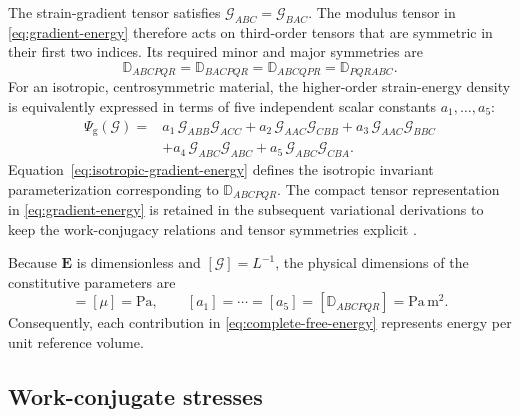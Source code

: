 \documentclass[preprint,12pt]{elsarticle}
\begin{document}
The strain-gradient tensor satisfies
$\mathcal{G}_{ABC}=\mathcal{G}_{BAC}$. The modulus tensor in
\eqref{eq:gradient-energy} therefore acts on third-order tensors that
are symmetric in their first two indices. Its required minor and major
symmetries are
\begin{equation}
 \mathbb{D}_{ABCPQR}
 =\mathbb{D}_{BACPQR}
 =\mathbb{D}_{ABCQPR}
 =\mathbb{D}_{PQRABC}.
 \label{eq:gradient-modulus-symmetries}
\end{equation}
For an isotropic, centrosymmetric material, the higher-order
strain-energy density is equivalently expressed in terms of five independent
scalar constants $a_1,\ldots,a_5$:
\begin{align}
 \Psi_{\mathrm{g}}(\bm{\mathcal{G}})
 ={}& a_1\,\mathcal{G}_{ABB}\mathcal{G}_{ACC}
 + a_2\,\mathcal{G}_{AAC}\mathcal{G}_{CBB}
 + a_3\,\mathcal{G}_{AAC}\mathcal{G}_{BBC}
 \nonumber\\
 &+ a_4\,\mathcal{G}_{ABC}\mathcal{G}_{ABC}
 + a_5\,\mathcal{G}_{ABC}\mathcal{G}_{CBA}.
 \label{eq:isotropic-gradient-energy}
\end{align}
Equation~\eqref{eq:isotropic-gradient-energy} defines the isotropic invariant
parameterization corresponding to $\mathbb{D}_{ABCPQR}$. The compact tensor
representation in \eqref{eq:gradient-energy} is retained in the subsequent
variational derivations to keep the work-conjugacy relations and tensor
symmetries explicit \cite{Mindlin1964,MindlinEshel1968}.

Because $\mathbf{E}$ is dimensionless and $[\bm{\mathcal{G}}]=L^{-1}$, the
physical dimensions of the constitutive parameters are
\begin{equation}
 [\lambda]=[\mu]=\mathrm{Pa},
 \qquad
 [a_1]=\cdots=[a_5]=[\mathbb{D}_{ABCPQR}]
 =\mathrm{Pa}\,\mathrm{m}^{2}.
 \label{eq:constitutive-units}
\end{equation}
Consequently, each contribution in \eqref{eq:complete-free-energy} represents
energy per unit reference volume.

\subsection{Work-conjugate stresses}
\label{sec:work-conjugate-stresses}
\end{document}
